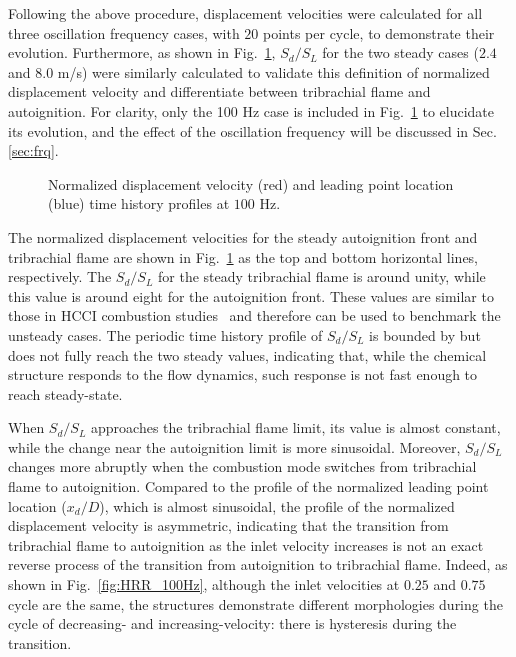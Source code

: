 \documentclass[review,3p,times]{elsarticle}
\begin{document}
Following the above procedure, displacement velocities were calculated for all three oscillation frequency cases, with $20$ points per cycle, to demonstrate their evolution.  Furthermore, as shown in Fig.~\ref{fig:sd_evo}, $S_d/S_L$ for the two steady cases ($2.4$ and $8.0$ m/s) were similarly calculated to validate this definition of normalized displacement velocity and differentiate between tribrachial flame and autoignition.  \textcolor{Rev1}{For clarity, only the 100 Hz case is included in Fig.~\ref{fig:sd_evo} to elucidate its evolution, and the effect of the oscillation frequency will be discussed in Sec.\ref{sec:frq}.}

\begin{figure}[t]
  \centering
  \scriptsize
  \resizebox{0.5\textwidth}{!}{}
  \normalsize
  \caption{Normalized displacement velocity (red) and leading point location (blue) time history profiles at $100$ Hz.}
  \label{fig:sd_evo}
\end{figure}


The normalized displacement velocities for the steady autoignition front and tribrachial flame are shown in Fig.~\ref{fig:sd_evo} as the top and bottom horizontal lines, respectively.  The $S_d/S_L$ for the steady tribrachial flame is around unity, while this value is around eight for the autoignition front.  These values are similar to those in HCCI combustion studies~\cite{yoo13} and therefore can be used to benchmark the unsteady cases.  The periodic time history profile of $S_d/S_L$ is bounded by but does not fully reach the two steady values, indicating that, while the chemical structure responds to the flow dynamics, such response is not fast enough to reach steady-state.  

When $S_d/S_L$ approaches the tribrachial flame limit, its value is almost constant, while the change near the autoignition limit is more sinusoidal.  Moreover, $S_d/S_L$ changes more abruptly when the combustion mode switches from tribrachial flame to autoignition.  Compared to the profile of the normalized leading point location ($x_d/D$), which is almost sinusoidal, the profile of the normalized displacement velocity is asymmetric, indicating that the transition from tribrachial flame to autoignition as the inlet velocity increases is not an exact reverse process of the transition from autoignition to tribrachial flame.  Indeed, as shown in Fig.~\ref{fig:HRR_100Hz}, although the inlet velocities at $0.25$ and $0.75$ cycle are the same, the structures demonstrate different morphologies during the cycle of decreasing- and increasing-velocity: there is hysteresis during the transition.
\end{document}
